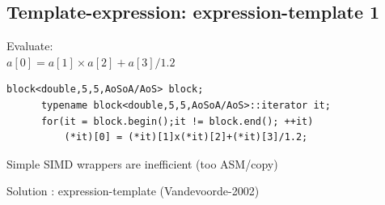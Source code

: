 \documentclass{beamer}
\begin{document}
\subsection*{Template-expression: expression-template 1}
\begin{frame}[fragile]
Evaluate: \\
\centering
$\boxed{a[0] = a[1]  \times a[2]  +a[3]/1.2}$

\vspace{0.5cm}

\begin{lstlisting}[flexiblecolumns=true,basicstyle=\sffamily]     
      block<double,5,5,AoSoA/AoS> block;
      typename block<double,5,5,AoSoA/AoS>::iterator it;
      for(it = block.begin();it != block.end(); ++it)
          (*it)[0] = (*it)[1]x(*it)[2]+(*it)[3]/1.2;
\end{lstlisting}
\vspace{0.5cm}

Simple SIMD wrappers are inefficient (too ASM/copy)

Solution : expression-template (Vandevoorde-2002)




\end{frame}



\end{document}
